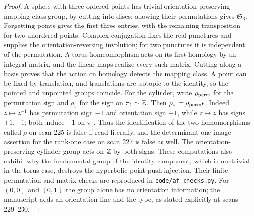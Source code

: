 \begin{proof}
A sphere with three ordered points has trivial orientation-preserving mapping class group, by cutting into discs; allowing their permutations gives $\mathfrak S_3$. Forgetting points gives the first three entries, with the remaining transposition for two unordered points. Complex conjugation fixes the real punctures and supplies the orientation-reversing involution; for two punctures it is independent of the permutation. A torus homeomorphism acts on its first homology by an integral matrix, and the linear maps realize every such matrix. Cutting along a basis proves that the action on homology detects the mapping class. A point can be fixed by translation, and translations are isotopic to the identity, so the pointed and unpointed groups coincide. For the cylinder, write $\rho_{\rm perm}$ for the permutation sign and $\rho_{\pi}$ for the sign on $\pi_1\simeq\mathbb Z$. Then $\rho_{\pi}=\rho_{\rm perm}\epsilon$. Indeed $z\mapsto z^{-1}$ has permutation sign $-1$ and orientation sign $+1$, while $z\mapsto\overline z$ has signs $+1,-1$; both induce $-1$ on $\pi_1$. Thus the identification of the two homomorphisms called $\rho$ on scan 225 is false if read literally, and the determinant-one image assertion for the rank-one case on scan 227 is false as well. The orientation-preserving cylinder group acts on $\mathbb Z$ by both signs. These computations also exhibit why the fundamental group of the identity component, which is nontrivial in the torus case, destroys the hyperbolic point-push injection. Their finite permutation and matrix checks are reproduced in \texttt{code/af\_checks.py}. For $(0,0)$ and $(0,1)$ the group alone has no orientation information; the manuscript adds an orientation line and the type, as stated explicitly at scans 229--230.
\end{proof}

